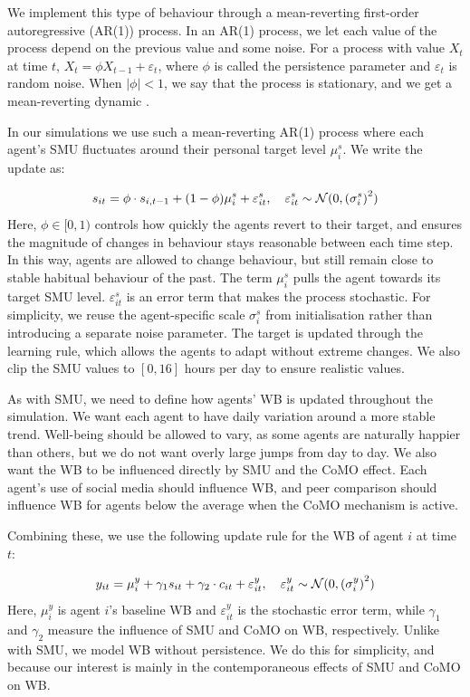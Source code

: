 We implement this type of behaviour through a mean-reverting first-order autoregressive (AR(1)) process. In an AR(1) process, we let each value of the process depend on the previous value and some noise. For a process with value $X_t$ at time $t$, $X_t = \phi X_{t-1} + \varepsilon_t$, where $\phi$ is called the persistence parameter and $\varepsilon_t$ is random noise. When $|\phi| < 1$, we say that the process is stationary, and we get a mean-reverting dynamic \parencite[Sec.~3.4, p.~53]{Hamilton1994}.

In our simulations we use such a mean-reverting AR(1) process where each agent's SMU fluctuates around their personal target level $\mu^s_i$. We write the update as:

\begin{equation}
    s_{it} = \phi \cdot s_{i,t-1} + (1 - \phi) \mu^s_i + \varepsilon^s_{it}, \quad \varepsilon^s_{it} \sim \mathcal{N}(0, {(\sigma^s_i)}^2)
    \label{eq:smu_ar1}
\end{equation}
Here, $\phi \in [0, 1)$ controls how quickly the agents revert to their target, and ensures the magnitude of changes in behaviour stays reasonable between each time step. In this way, agents are allowed to change behaviour, but still remain close to stable habitual behaviour of the past. The term $\mu^s_i$ pulls the agent towards its target SMU level. $\varepsilon^s_{it}$ is an error term that makes the process stochastic. For simplicity, we reuse the agent-specific scale $\sigma^s_i$ from initialisation rather than introducing a separate noise parameter. The target is updated through the learning rule, which allows the agents to adapt without extreme changes. We also clip the SMU values to $[0, 16]$ hours per day to ensure realistic values.

As with SMU, we need to define how agents' WB is updated throughout the simulation. We want each agent to have daily variation around a more stable trend. Well-being should be allowed to vary, as some agents are naturally happier than others, but we do not want overly large jumps from day to day. We also want the WB to be influenced directly by SMU and the CoMO effect. Each agent's use of social media should influence WB, and peer comparison should influence WB for agents below the average when the CoMO mechanism is active.

Combining these, we use the following update rule for the WB of agent $i$ at time $t$:

\begin{equation}
    y_{it} = \mu^y_i + \gamma_1 s_{it} + \gamma_2 \cdot c_{it} + \varepsilon^y_{it}, \quad \varepsilon^y_{it} \sim \mathcal{N}(0, {(\sigma^y_i)}^2)
    \label{eq:wb_basic}
\end{equation}
Here, $\mu^y_i$ is agent $i$'s baseline WB and $\varepsilon^y_{it}$ is the stochastic error term, while $\gamma_1$ and $\gamma_2$ measure the influence of SMU and CoMO on WB, respectively. Unlike with SMU, we model WB without persistence. We do this for simplicity, and because our interest is mainly in the contemporaneous effects of SMU and CoMO on WB\@.

